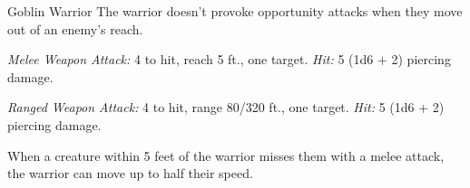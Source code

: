 \documentclass[10pt,a4paper,twoside,bg=print,twocolumn,openany,nodeprecatedcode]{dndbook}
\begin{document}
\begin{DndMonster}[float=t]{Goblin Warrior}
\DndMonsterBasics[
armor-class = {15 (\textit{leather armor})},
hit-points = {\DndDice{2d6 + 2}},
speed = {30 ft., climb 20 ft.}
]
\DndMonsterAbilityScores[
 str = 8,
 dex = 14,
 con = 12,
 int = 10,
 wis = 10,
 cha = 8
]
\DndMonsterDetails[
skills = {Acrobatics +4, Stealth +4},
senses = {darkvision 60 ft., passive perception 10},
languages = {Common, Goblin},
challenge = 1/4,
]
The warrior doesn't provoke opportunity attacks when they move out of an enemy's reach.

\textsl{Melee Weapon Attack:} 4 to hit, reach 5 ft., one target. \textsl{Hit:} 5 (1d6 + 2) piercing damage.

\textsl{Ranged Weapon Attack:} 4 to hit, range 80/320 ft., one target. \textsl{Hit:} 5 (1d6 + 2) piercing damage.

When a creature within 5 feet of the warrior misses them with a melee attack, the warrior can move up to half their speed.

\end{DndMonster}
\end{document}
